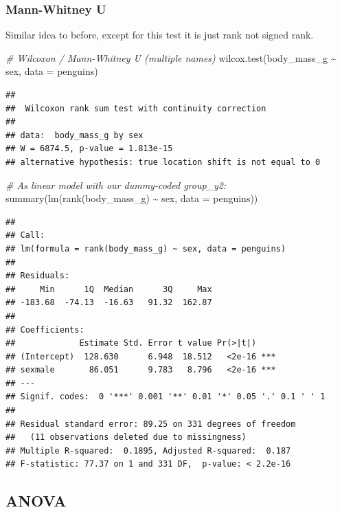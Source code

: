\documentclass[
]{book}
\newenvironment{Shaded}{\begin{snugshade}}{\end{snugshade}}
\newcommand{\AttributeTok}[1]{\textcolor[rgb]{0.77,0.63,0.00}{#1}}
\newcommand{\CommentTok}[1]{\textcolor[rgb]{0.56,0.35,0.01}{\textit{#1}}}
\newcommand{\FunctionTok}[1]{\textcolor[rgb]{0.00,0.00,0.00}{#1}}
\newcommand{\NormalTok}[1]{#1}
\newcommand{\SpecialCharTok}[1]{\textcolor[rgb]{0.00,0.00,0.00}{#1}}
\begin{document}
\hypertarget{mann-whitney-u}{%
\subsubsection{Mann-Whitney U}\label{mann-whitney-u}}

Similar idea to before, except for this test it is just rank not signed rank.

\begin{Shaded}
\begin{Highlighting}[]
\CommentTok{\# Wilcoxon / Mann{-}Whitney U (multiple names)}
\FunctionTok{wilcox.test}\NormalTok{(body\_mass\_g }\SpecialCharTok{\textasciitilde{}}\NormalTok{ sex, }\AttributeTok{data =}\NormalTok{ penguins)}
\end{Highlighting}
\end{Shaded}

\begin{verbatim}
## 
##  Wilcoxon rank sum test with continuity correction
## 
## data:  body_mass_g by sex
## W = 6874.5, p-value = 1.813e-15
## alternative hypothesis: true location shift is not equal to 0
\end{verbatim}

\begin{Shaded}
\begin{Highlighting}[]
\CommentTok{\# As linear model with our dummy{-}coded group\_y2:}
\FunctionTok{summary}\NormalTok{(}\FunctionTok{lm}\NormalTok{(}\FunctionTok{rank}\NormalTok{(body\_mass\_g) }\SpecialCharTok{\textasciitilde{}}\NormalTok{ sex, }\AttributeTok{data =}\NormalTok{ penguins))}
\end{Highlighting}
\end{Shaded}

\begin{verbatim}
## 
## Call:
## lm(formula = rank(body_mass_g) ~ sex, data = penguins)
## 
## Residuals:
##     Min      1Q  Median      3Q     Max 
## -183.68  -74.13  -16.63   91.32  162.87 
## 
## Coefficients:
##             Estimate Std. Error t value Pr(>|t|)    
## (Intercept)  128.630      6.948  18.512   <2e-16 ***
## sexmale       86.051      9.783   8.796   <2e-16 ***
## ---
## Signif. codes:  0 '***' 0.001 '**' 0.01 '*' 0.05 '.' 0.1 ' ' 1
## 
## Residual standard error: 89.25 on 331 degrees of freedom
##   (11 observations deleted due to missingness)
## Multiple R-squared:  0.1895, Adjusted R-squared:  0.187 
## F-statistic: 77.37 on 1 and 331 DF,  p-value: < 2.2e-16
\end{verbatim}

\hypertarget{anova}{%
\subsection{ANOVA}\label{anova}}
\end{document}
